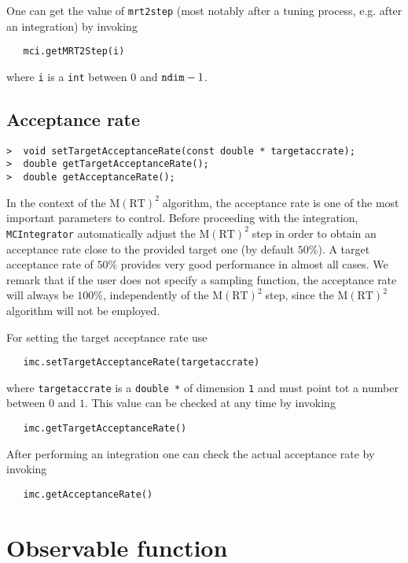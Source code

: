 \documentclass[11pt,a4paper,twoside]{article}
\newcommand{\MRTWO}{$ \text{M}(\text{RT})^2 \;$}
\begin{document}
One can get the value of \verb+mrt2step+ (most notably after a tuning process, e.g. after an integration) by invoking
\begin{verbatim}
   mci.getMRT2Step(i)
\end{verbatim}
where \verb+i+ is a \verb+int+ between $0$ and $\verb+ndim+-1$.



\subsection{Acceptance rate} %
\label{sub:acceptance_rate}

\begin{verbatim}
>  void setTargetAcceptanceRate(const double * targetaccrate);   
>  double getTargetAcceptanceRate();
>  double getAcceptanceRate();
\end{verbatim}

In the context of the \MRTWO algorithm, the acceptance rate is one of the most important parameters to control.
Before proceeding with the integration, \verb+MCIntegrator+ automatically adjust the \MRTWO step in order to obtain an acceptance rate close to the provided target one (by default $50\%$).
A target acceptance rate of $50\%$ provides very good performance in almost all cases.
We remark that if the user does not specify a sampling function, the acceptance rate will always be $100\%$, independently of the \MRTWO step, since the \MRTWO algorithm will not be employed.

For setting the target acceptance rate use
\begin{verbatim}
   imc.setTargetAcceptanceRate(targetaccrate)
\end{verbatim}
where \verb+targetaccrate+ is a \verb+double *+ of dimension \verb+1+ and must point tot a number between $0$ and $1$.
This value can be checked at any time by invoking
\begin{verbatim}
   imc.getTargetAcceptanceRate()
\end{verbatim}

After performing an integration one can check the actual acceptance rate by invoking
\begin{verbatim}
   imc.getAcceptanceRate()
\end{verbatim}


\section{Observable function} %
\label{sec:observable_function}
\end{document}
